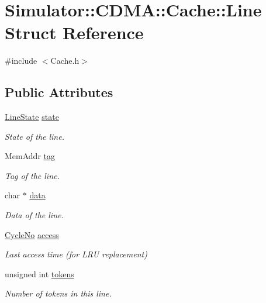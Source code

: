 \hypertarget{struct_simulator_1_1_c_d_m_a_1_1_cache_1_1_line}{\section{Simulator\+:\+:C\+D\+M\+A\+:\+:Cache\+:\+:Line Struct Reference}
\label{struct_simulator_1_1_c_d_m_a_1_1_cache_1_1_line}
}


{\ttfamily \#include $<$Cache.\+h$>$}

\subsection*{Public Attributes}
\begin{DoxyCompactItemize}
\item 
\hyperlink{class_simulator_1_1_c_d_m_a_1_1_cache_a77855c6e5bb01a9ab1da0e1cb5e80a3f}{Line\+State} \hyperlink{struct_simulator_1_1_c_d_m_a_1_1_cache_1_1_line_af60d88ab961b6019c76cd66ef0b6c23a}{state}
\begin{DoxyCompactList}\small\item\em State of the line. \end{DoxyCompactList}\item 
Mem\+Addr \hyperlink{struct_simulator_1_1_c_d_m_a_1_1_cache_1_1_line_a6c21618c9cdde8b05c0bb29d79b85575}{tag}
\begin{DoxyCompactList}\small\item\em Tag of the line. \end{DoxyCompactList}\item 
char $\ast$ \hyperlink{struct_simulator_1_1_c_d_m_a_1_1_cache_1_1_line_ab7fed1d8d57d1346a8aec0f4da72e8f7}{data}
\begin{DoxyCompactList}\small\item\em Data of the line. \end{DoxyCompactList}\item 
\hyperlink{namespace_simulator_a928f1e2101eba21bb0fe409e8c9ce573}{Cycle\+No} \hyperlink{struct_simulator_1_1_c_d_m_a_1_1_cache_1_1_line_a8ff21723afff19b77f205320c3beb774}{access}
\begin{DoxyCompactList}\small\item\em Last access time (for L\+R\+U replacement) \end{DoxyCompactList}\item 
unsigned int \hyperlink{struct_simulator_1_1_c_d_m_a_1_1_cache_1_1_line_a3b8c12dfbaee09b77c1cf58c75fc475c}{tokens}
\begin{DoxyCompactList}\small\item\em Number of tokens in this line. \end{DoxyCompactList}\item 

\end{DoxyCompactItemize}
